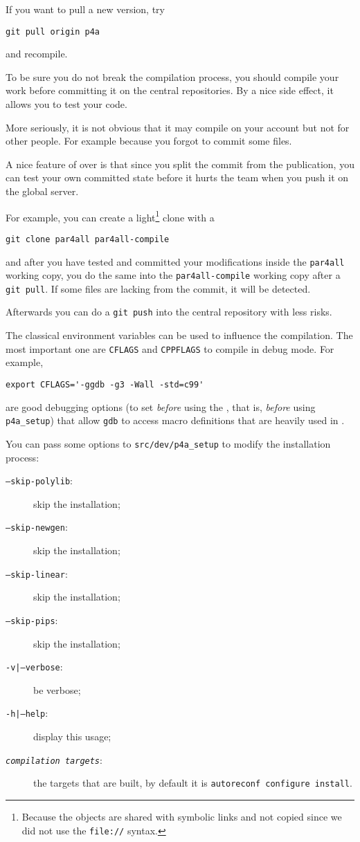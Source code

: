 \documentclass[a4paper]{article}
\begin{document}
If you want to pull a new version, try
\begin{verbatim}
git pull origin p4a
\end{verbatim}
and recompile.

To be sure you do not break the compilation process, you should compile
your work before committing it on the central repositories. By a nice side
effect, it allows you to test your code. \smiley

More seriously, it is not obvious that it may compile on your account but
not for other people. For example because you forgot to commit some files.

A nice feature of \Agit over \Asvn is that since you split the commit from
the publication, you can test your own committed state before it hurts the
team when you push it on the global server.

For example, you can create a light\footnote{Because the objects are
  shared with symbolic links and not copied since we did not use the
  \texttt{file://} syntax.} clone with a
\begin{verbatim}
git clone par4all par4all-compile
\end{verbatim}
and after you have tested and committed your modifications inside the
\texttt{par4all} working copy, you do the same into the
\texttt{par4all-compile} working copy after a \texttt{git pull}.
If some files are lacking from the commit, it will be detected.

Afterwards you can do a \texttt{git push} into the central \Apfa
repository with less risks.

The classical \Aautotools environment variables can be used to influence
the compilation. The most important one are \texttt{CFLAGS} and
\texttt{CPPFLAGS} to compile \Apfa in debug mode. For example,
\begin{verbatim}
export CFLAGS='-ggdb -g3 -Wall -std=c99'
\end{verbatim}
are good debugging options (to set \emph{before} using the \Aautotools,
that is, \emph{before} using \verb|p4a_setup|) that allow \texttt{gdb} to
access macro definitions that are heavily used in \Apips.

You can pass some options to \verb|src/dev/p4a_setup| to modify the
installation process:
\begin{description}
\item[\texttt{--skip-polylib}:] skip the \Apolylib installation;
\item[\texttt{--skip-newgen}:] skip the \Anewgen installation;
\item[\texttt{--skip-linear}:] skip the \Alinear installation;
\item[\texttt{--skip-pips}:] skip the \Apips installation;
\item[\texttt{-v|--verbose}:] be verbose;
\item[\texttt{-h|--help}:] display this usage;
\item[\texttt{\emph{compilation targets}}:] the targets that are built, by
  default it is \texttt{autoreconf configure install}.
\end{description}
\end{document}
